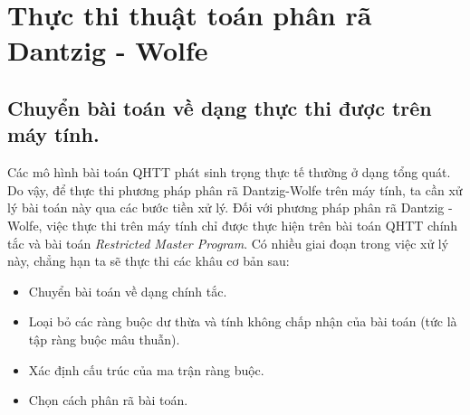 \setcounter{chapter}{2}
\chapter{Thực thi thuật toán phân rã Dantzig - Wolfe}

\section{Chuyển bài toán về dạng thực thi được trên máy tính.}
Các mô hình bài toán QHTT phát sinh trọng thực tế thường ở dạng tổng quát. Do vậy, để thực thi phương pháp phân rã Dantzig-Wolfe trên máy tính, ta cần xử lý bài toán này qua các bước tiền xử lý. Đối với phương pháp phân rã Dantzig - Wolfe, việc thực thi trên máy tính chỉ được thực hiện trên bài toán QHTT chính tắc và bài toán {\it Restricted Master Program}. Có nhiều giai đoạn trong việc xử lý này, chẳng hạn ta sẽ thực thi các khâu cơ bản sau:
\begin{itemize}
\item Chuyển bài toán về dạng chính tắc.
\item Loại bỏ các ràng buộc dư thừa và tính không chấp nhận của bài toán (tức là tập ràng buộc mâu thuẫn).
\item Xác định cấu trúc của ma trận ràng buộc.
\item Chọn cách phân rã bài toán.
\end{itemize}
